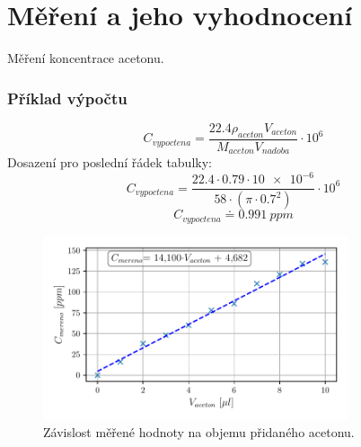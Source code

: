 \documentclass{protokol}
\begin{document}
    \maketitle

    \section{Měření a jeho vyhodnocení }

    \begin{table}[ht!]
        \caption{Měření koncentrace acetonu.}
        \def\arraystretch{1.2}
        \centering
        
    \end{table}
    
    \subsubsection{Příklad výpočtu}
    
    \[
        C_{vypoctena} =  \frac{\num{22.4}\rho_{aceton}  V_{aceton}  }{M_{aceton} V_{nadoba} }\cdot 10^6
    \]
    Dosazení pro poslední řádek tabulky:
    \[
        C_{vypoctena} =  \frac{\num{22.4}\cdot \num{0.79}\cdot \num{10e-6}}{\num{58} \cdot  (\pi \cdot \num{0.7}^2) }\cdot 10^6
    \]
    \[
        C_{vypoctena} \doteq \qty{0.991}{ppm}
    \]
    \begin{figure}[h!]
        \centering
        \includegraphics[width=0.8\textwidth]{img/konc-mer.pdf}
        \caption{Závislost měřené hodnoty na objemu přidaného acetonu.}
        \label{fig:img/graf-1}
    \end{figure}
\end{document}
